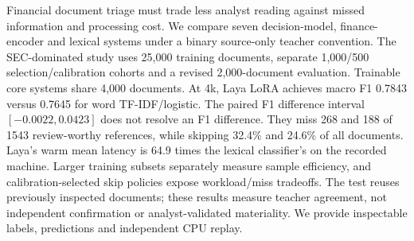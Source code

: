 Financial document triage must trade less analyst reading against missed information and processing cost. We compare seven decision-model, finance-encoder and lexical systems under a binary source-only teacher convention. The SEC-dominated study uses 25,000 training documents, separate 1,000/500 selection/calibration cohorts and a revised 2,000-document evaluation. Trainable core systems share 4,000 documents. At 4k, Laya LoRA achieves macro F1 0.7843 versus 0.7645 for word TF-IDF/logistic. The paired F1 difference interval $[-0.0022, 0.0423]$ does not resolve an F1 difference. They miss 268 and 188 of 1543 review-worthy references, while skipping 32.4\% and 24.6\% of all documents. Laya's warm mean latency is 64.9 times the lexical classifier's on the recorded machine. Larger training subsets separately measure sample efficiency, and calibration-selected skip policies expose workload/miss tradeoffs. The test reuses previously inspected documents; these results measure teacher agreement, not independent confirmation or analyst-validated materiality. We provide inspectable labels, predictions and independent CPU replay.
